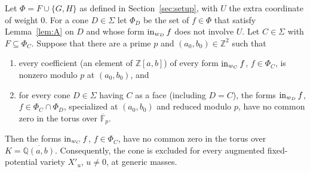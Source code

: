 \documentclass[11pt]{amsart}
\theoremstyle{definition}\newtheorem{definition}[theorem]{Definition}\theoremstyle{remark}\newtheorem{remark}[theorem]{Remark}
\begin{document}
\begin{lemma}\label{lem:S}
Let $\Phi=F\cup\{G,H\}$ as defined in Section~\ref{sec:setup}, with $U$ the extra coordinate of weight $0$. For a cone $D\in\Sigma$ let
$\Phi_D$ be the set of $f\in\Phi$ that satisfy Lemma~\ref{lem:A} on $D$ and whose form $\operatorname{in}_{w_D}f$ does not involve $U$.
Let $C\in\Sigma$ with $F\subseteq\Phi_C$. Suppose that there are a prime $p$ and $(a_0,b_0)\in\mathbb{Z}^2$ such that
\begin{enumerate}
\item every coefficient (an element of $\mathbb{Z}[a,b]$) of every form $\operatorname{in}_{w_C}f$, $f\in\Phi_C$, is nonzero modulo $p$ at $(a_0,b_0)$, and
\item for every cone $D\in\Sigma$ having $C$ as a face (including $D=C$), the forms $\operatorname{in}_{w_D}f$, $f\in\Phi_C\cap\Phi_D$, specialized at $(a_0,b_0)$
and reduced modulo $p$, have no common zero in the torus over $\overline{\mathbb{F}}_p$.
\end{enumerate}
Then the forms $\operatorname{in}_{w_C}f$, $f\in\Phi_C$, have no common zero in the torus over $K=\overline{\mathbb{Q}(a,b)}$. Consequently, the cone is excluded for every augmented fixed-potential variety $X'_u$, $u\ne0$, at generic masses.
\end{lemma}
\end{document}
